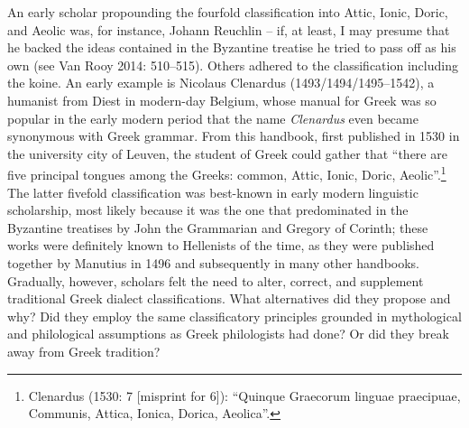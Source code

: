 \documentclass[12pt]{article}
\newenvironment{styleStandard}{\renewcommand\baselinestretch{1.25}\setlength\leftskip{0in}\setlength\rightskip{0in}\setlength\parindent{0.1972in}\setlength\parfillskip{0pt plus 1fil}\setlength\parskip{0in plus 1pt}\writerlistparindent\writerlistleftskip\leavevmode\normalfont\normalsize\writerlistlabel\ignorespaces}{\unskip\vspace{0in plus 1pt}\par}
\newcommand\writerlistleftskip{}
\newcommand\writerlistparindent{}
\newcommand\writerlistlabel{}
\begin{document}
\begin{styleStandard}
An early scholar propounding the fourfold classification into Attic, Ionic, Doric, and Aeolic was, for instance, Johann Reuchlin – if, at least, I may presume that he backed the ideas contained in the Byzantine treatise he tried to pass off as his own (see Van Rooy 2014: 510–515). Others adhered to the classification including the koine. An early example is Nicolaus Clenardus (1493/1494/1495–1542), a humanist from Diest in modern-day Belgium, whose manual for Greek was so popular in the early modern period that the name \textit{Clenardus} even became synonymous with Greek grammar. From this handbook, first published in 1530 in the university city of Leuven, the student of Greek could gather that “there are five principal tongues among the Greeks: common, Attic, Ionic, Doric, Aeolic”.\footnote{ Clenardus (1530: 7 [misprint for 6]): “Quinque Graecorum linguae praecipuae, Communis, Attica, Ionica, Dorica, Aeolica”.} The latter fivefold classification was best-known in early modern linguistic scholarship, most likely because it was the one that predominated in the Byzantine treatises by John the Grammarian and Gregory of Corinth; these works were definitely known to Hellenists of the time, as they were published together by Manutius in 1496 and subsequently in many other handbooks. Gradually, however, scholars felt the need to alter, correct, and supplement traditional Greek dialect classifications. What alternatives did they propose and why? Did they employ the same classificatory principles grounded in mythological and philological assumptions as Greek philologists had done? Or did they break away from Greek tradition?
\end{styleStandard}
\end{document}
